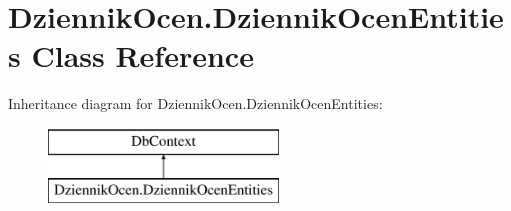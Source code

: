 \hypertarget{class_dziennik_ocen_1_1_dziennik_ocen_entities}{}\section{Dziennik\+Ocen.\+Dziennik\+Ocen\+Entities Class Reference}
\label{class_dziennik_ocen_1_1_dziennik_ocen_entities}
Inheritance diagram for Dziennik\+Ocen.\+Dziennik\+Ocen\+Entities\+:\begin{figure}[H]
\begin{center}
\leavevmode
\includegraphics[height=2.000000cm]{class_dziennik_ocen_1_1_dziennik_ocen_entities}
\end{center}
\end{figure}
